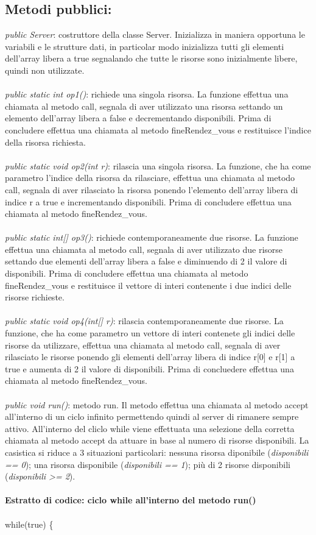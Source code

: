 \documentclass[10pt, a4paper]{article}
\begin{document}
\subsection{Metodi pubblici:}
\textit{public Server}: costruttore della classe Server. Inizializza in maniera opportuna le variabili e le strutture dati, in particolar modo inizializza tutti gli elementi dell'array libera a true segnalando che tutte le risorse sono inizialmente libere, quindi non utilizzate.
\\\\
\textit{public static int op1()}: richiede una singola risorsa. La funzione effettua una chiamata al metodo call, segnala di aver utilizzato una risorsa settando un elemento dell'array libera a false e decrementando disponibili. Prima di concludere effettua una chiamata al metodo fineRendez\_vous e restituisce l'indice della risorsa richiesta.
\\\\
\textit{public static void op2(int r)}: rilascia una singola risorsa. La funzione, che ha come parametro l'indice della risorsa da rilasciare, effettua una chiamata al metodo call, segnala di aver rilasciato la risorsa ponendo l'elemento dell'array libera di indice r a true e incrementando disponibili. Prima di concludere effettua una chiamata al metodo fineRendez\_vous.
\\\\
\textit{public static int[] op3()}: richiede contemporaneamente due risorse. La funzione effettua una chiamata al metodo call, segnala di aver utilizzato due risorse settando due elementi dell'array libera a false e diminuendo di 2 il valore di disponibili. Prima di concludere effettua una chiamata al metodo fineRendez\_vous e restituisce il vettore di interi contenente i due indici delle risorse richieste.
\\\\
\textit{public static void op4(int[] r)}: rilascia contemporaneamente due risorse. La funzione, che ha come parametro un vettore di interi contenete gli indici delle risorse da utilizzare, effettua una chiamata al metodo call, segnala di aver rilasciato le risorse ponendo gli elementi dell'array libera di indice r[0] e r[1] a true e aumenta di 2 il valore di disponibili. Prima di concluedere effettua una chiamata al metodo fineRendez\_vous.
\\\\
\textit{public void run()}: metodo run. Il metodo effettua una chiamata al metodo accept all'interno di un ciclo infinito permettendo quindi al server di rimanere sempre attivo. All'interno del cliclo while viene effettuata una selezione della corretta chiamata al metodo accept da attuare in base al numero di risorse disponibili. La casistica si riduce a 3 situazioni particolari: nessuna risorsa diponibile (\textit{disponibili == 0}); una risorsa disponibile (\textit{disponibili == 1}); più di 2 risorse disponibili (\textit{disponibili \textgreater= 2}).
\\\\
\textbf{Estratto di codice: ciclo while all'interno del metodo run()}
\\\\
while(true) \{ 
\end{document}

